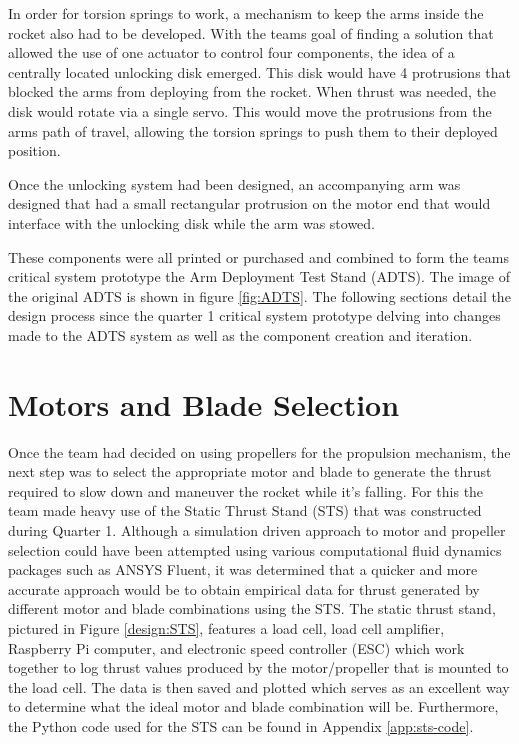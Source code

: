 In order for torsion springs to work, a mechanism to keep the arms inside the rocket also had to be developed. With the teams goal of finding a solution that allowed the use of one actuator to control four components, the idea of a centrally located unlocking disk emerged. This disk would have 4 protrusions that blocked the arms from deploying from the rocket. When thrust was needed, the disk would rotate via a single servo. This would move the protrusions from the arms path of travel, allowing the torsion springs to push them to their deployed position.

Once the unlocking system had been designed, an accompanying arm was designed that had a small rectangular protrusion on the motor end that would interface with the unlocking disk while the arm was stowed. 

These components were all printed or purchased and combined to form the teams critical system prototype the Arm Deployment Test Stand (ADTS). The image of the original ADTS is shown in figure \ref{fig:ADTS}. The following sections detail the design process since the quarter 1 critical system prototype delving into changes made to the ADTS system as well as the component creation and iteration.

\section{Motors and Blade Selection}
\label{design:motors-selection}
Once the team had decided on using propellers for the propulsion mechanism, the next step was to select the appropriate motor and blade to generate the thrust required to slow down and maneuver the rocket while it's falling. For this the team made heavy use of the Static Thrust Stand (STS) that was constructed during Quarter 1. Although a simulation driven approach to motor and propeller selection could have been attempted using various computational fluid dynamics packages such as ANSYS Fluent, it was determined that a quicker and more accurate approach would be to obtain empirical data for thrust generated by different motor and blade combinations using the STS. The static thrust stand, pictured in Figure \ref{design:STS}, features a load cell, load cell amplifier, Raspberry Pi computer, and electronic speed controller (ESC) which work together to log thrust values produced by the motor/propeller that is mounted to the load cell. The data is then saved and plotted which serves as an excellent way to determine what the ideal motor and blade combination will be. Furthermore, the Python code used for the STS can be found in Appendix \ref{app:sts-code}.

